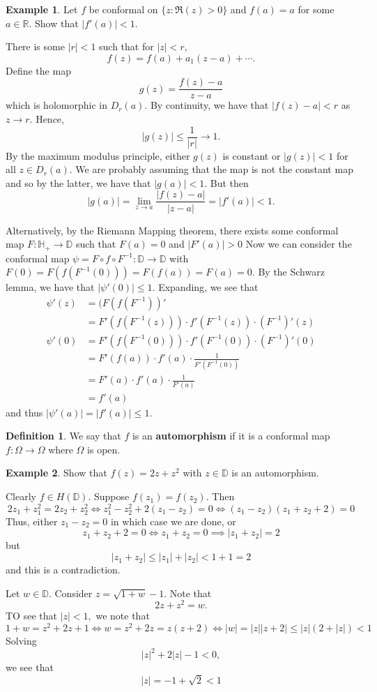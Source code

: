 \documentclass[10pt, oneside]{article}
\newcommand{\bbR}{\mathbb{R}}
\theoremstyle{definition}
\newtheorem{exmp}{Example}[section]
\newtheorem{defn}{Definition}
\newcommand{\bbD}{\mathbb{D}}
\newcommand{\bbH}{\mathbb{H}}
\newcommand{\bbR}{\mathbb{R}}
\begin{document}
\begin{exmp}
    Let $f$ be conformal on $\{z: \Re{(z) >0}\}$ and $f(a) = a $ for some $a\in \bbR.$ Show that $|f'(a)| < 1.$

    There is some $|r|<1$ such that for $|z| < r ,$ 
    \[f(z) = f(a) + a_1(z-a) + \cdots.\] Define the map
    \[g(z) = \frac{f(z) - a}{z - a}\] which is holomorphic in $D_r(a).$ 
    By continuity, we have that $|f(z) - a| < r$ as $z \to r.$ Hence, 
    \[|g(z)| \leq \frac{1}{|r|} \to 1.\] By the maximum modulus principle, either $g(z)$ is constant or $|g(z)|< 1$ for all $z\in D_r(a).$ We are probably assuming that the map is not the constant map and so by the latter, we have that $|g(a)| < 1.$ But then 
    \[|g(a)| = \lim_{z\to a}\frac{|f(z) - a|}{|z-a|} =|f'(a)|< 1.\]

Alternatively, by the Riemann Mapping theorem, there exists some conformal map $F: \bbH_+ \to \bbD$ such that $F(a) = 0$ and $|F'(a)| >0$ Now we can consider the conformal map $\psi = F\circ f \circ F^{-1}: \bbD \to \bbD$ with $F(0) = F(f(F^{-1}(0))) = F(f(a)) = F(a)= 0.$ By the Schwarz lemma, we have that $|\psi'(0)| \leq 1.$ Expanding, we see that 
\begin{align*}
\psi'(z) &= (F(f(F^{-1}))'\\ &= F'(f(F^{-1}(z)))\cdot f'(F^{-1}(z))\cdot (F^{-1})'(z)\\
\psi'(0) &= F'(f(F^{-1}(0)))\cdot f'(F^{-1}(0))\cdot (F^{-1})'(0)\\
&= F'(f(a)) \cdot f'(a)\cdot \frac{1}{F'(F^{-1}(0))}\\
&= F'(a)\cdot f'(a) \cdot \frac{1}{F'(a)}\\
&= f'(a)
\end{align*}
and thus $|\psi'(a)| = |f'(a)| \leq 1.$ 


    \end{exmp}

\begin{defn}
We say that $f$ is an \textbf{automorphism} if it is a conformal map $f: \Omega \to \Omega$ where $\Omega$ is open. 
\end{defn}

\begin{exmp}
    Show that $f(z) = 2z + z^2$ with $z\in \mathbb{D}$ is an automorphism.

    Clearly $f \in H(\bbD).$ Suppose $f(z_1) = f(z_2).$ Then 
    \[2z_1 + z_1^2 = 2z_2 + z_2^2 \iff z_1^2 - z_2^2 + 2(z_1 - z_2) = 0\iff (z_1 - z_2)(z_1 + z_2 + 2) = 0\]
    Thus, either $z_1 - z_2 = 0$ in which case we are done, or 
    \[z_1 + z_2 + 2 = 0 \iff z_1 + z_2 = 0 \implies |z_1 + z_2| = 2\] but 
    \[|z_1 + z_2| \leq |z_1| + |z_2| < 1 + 1 = 2\] and this is a contradiction.

    Let $w\in \bbD.$ Consider $z = \sqrt{1 + w} -  1.$ Note that 
    \[2z + z^2 = w.\] TO see that $|z| < 1,$ we note that 
    \[1 + w = z^2 + 2z + 1 \iff w = z^2 + 2z = z(z + 2) \iff |w| = |z||z + 2| \leq |z|(2 + |z|) < 1\] Solving 
    \[|z|^2 + 2|z| - 1 <0,\] we see that \[|z| = -1 + \sqrt{2} < 1\]
\end{exmp}
\end{document}
